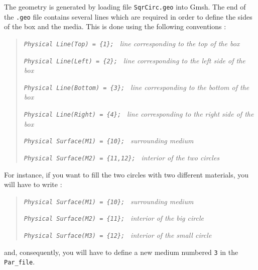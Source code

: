 \documentclass[oneside,english,onecolumn,letterpaper]{book}
\begin{document}
The geometry is generated by loading file \texttt{SqrCirc.geo} into
Gmsh. The end of the \texttt{.geo} file contains several lines which
are required in order to define the sides of the box and the media.
This is done using the following conventions :
%
\begin{quote}
\texttt{\textit{Physical Line(\textquotedbl Top\textquotedbl)
= \{1\}; }}
\textsf{\textit{\small line corresponding to the top of the box}}

\texttt{\textit{Physical Line(\textquotedbl Left\textquotedbl)
= \{2\}; }}
\textsf{\textit{\small line corresponding to the left side of the box}}

\texttt{\textit{Physical Line(\textquotedbl Bottom\textquotedbl)
= \{3\}; }}
\textsf{\textit{\small line corresponding to the bottom of the box}}

\texttt{\textit{Physical Line(\textquotedbl Right\textquotedbl)
= \{4\}; }}
\textsf{\textit{\small line corresponding to the right side of the box}}

\texttt{\textit{Physical Surface(\textquotedbl M1\textquotedbl)
= \{10\}; }}
\textsf{\textit{\small surrounding medium}}

\texttt{\textit{Physical Surface(\textquotedbl M2\textquotedbl)
= \{11,12\}; }}
\textsf{\textit{\small interior of the two circles}}
\end{quote}
%
For instance, if you want to fill the two circles with two different
materials, you will have to write :
%
\begin{quote}
\texttt{\textit{Physical Surface(\textquotedbl M1\textquotedbl)
= \{10\}; }}
\textsf{\textit{\small surrounding medium}}

\texttt{\textit{Physical Surface(\textquotedbl M2\textquotedbl)
= \{11\}; }}
\textsf{\textit{\small interior of the big circle}}

\texttt{\textit{Physical Surface(\textquotedbl M3\textquotedbl)
= \{12\}; }}
\textsf{\textit{\small interior of the small circle}}
\end{quote}
%
and, consequently, you will have to define a new medium numbered \texttt{3}
in the \texttt{Par\_file}.
\end{document}

